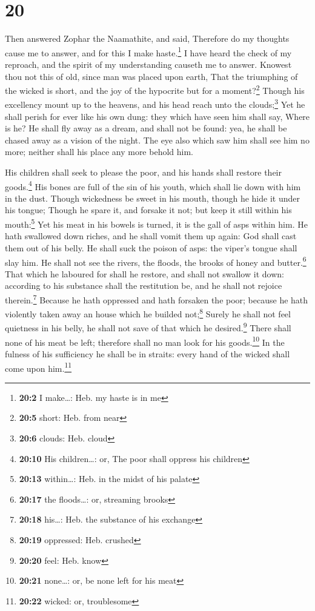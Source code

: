 \hypertarget{section-19}{%
\section{20}\label{section-19}}

 Then answered Zophar the Naamathite, and said,
 Therefore do my thoughts cause me to answer, and for this
I make haste.\footnote{\textbf{20:2} I make\ldots: Heb. my haste is in
  me}  I have heard the check of my reproach, and the
spirit of my understanding causeth me to answer.  Knowest
thou not this of old, since man was placed upon earth, 
That the triumphing of the wicked is short, and the joy of the hypocrite
but for a moment?\footnote{\textbf{20:5} short: Heb. from near}
 Though his excellency mount up to the heavens, and his
head reach unto the clouds;\footnote{\textbf{20:6} clouds: Heb. cloud}
 Yet he shall perish for ever like his own dung: they
which have seen him shall say, Where is he?  He shall fly
away as a dream, and shall not be found: yea, he shall be chased away as
a vision of the night.  The eye also which saw him shall
see him no more; neither shall his place any more behold him.

 His children shall seek to please the poor, and his
hands shall restore their goods.\footnote{\textbf{20:10} His
  children\ldots: or, The poor shall oppress his children}
 His bones are full of the sin of his youth, which shall
lie down with him in the dust.  Though wickedness be
sweet in his mouth, though he hide it under his tongue; 
Though he spare it, and forsake it not; but keep it still within his
mouth:\footnote{\textbf{20:13} within\ldots: Heb. in the midst of his
  palate}  Yet his meat in his bowels is turned, it is
the gall of asps within him.  He hath swallowed down
riches, and he shall vomit them up again: God shall cast them out of his
belly.  He shall suck the poison of asps: the viper's
tongue shall slay him.  He shall not see the rivers, the
floods, the brooks of honey and butter.\footnote{\textbf{20:17} the
  floods\ldots: or, streaming brooks}  That which he
laboured for shall he restore, and shall not swallow it down: according
to his substance shall the restitution be, and he shall not rejoice
therein.\footnote{\textbf{20:18} his\ldots: Heb. the substance of his
  exchange}  Because he hath oppressed and hath forsaken
the poor; because he hath violently taken away an house which he builded
not;\footnote{\textbf{20:19} oppressed: Heb. crushed} 
Surely he shall not feel quietness in his belly, he shall not save of
that which he desired.\footnote{\textbf{20:20} feel: Heb. know}
 There shall none of his meat be left; therefore shall no
man look for his goods.\footnote{\textbf{20:21} none\ldots: or, be none
  left for his meat}  In the fulness of his sufficiency
he shall be in straits: every hand of the wicked shall come upon
him.\footnote{\textbf{20:22} wicked: or, troublesome}

